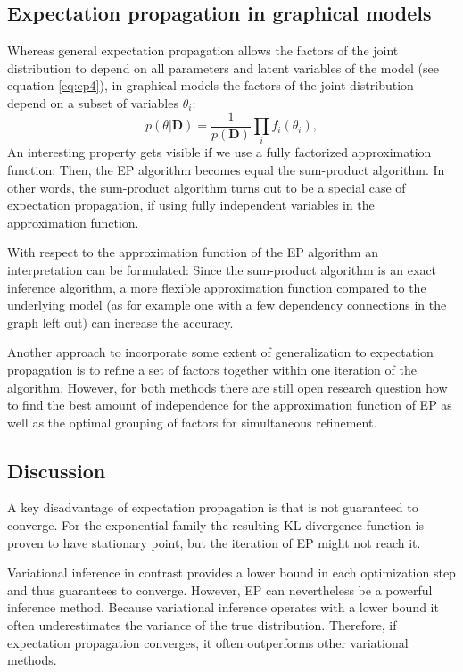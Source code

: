 \documentclass{sigkdd}
\begin{document}
\subsection{Expectation propagation in graphical models}
Whereas general expectation propagation allows the factors of the joint distribution to depend on all parameters and latent variables of the model (see equation \ref{eq:ep4}), in graphical models the factors of the joint distribution depend on a subset of variables $\theta_i$:
\begin{equation}\label{eq:ep9}
p(\theta|\mathbf{D}) = \frac{1}{p(\mathbf{D})} \prod_i f_i(\theta_i),
\end{equation}
An interesting property gets visible if we use a fully factorized approximation function: Then, the EP algorithm becomes equal the sum-product algorithm. In other words, the sum-product algorithm turns out to be a special case of expectation propagation, if using fully independent variables in the approximation function.

With respect to the approximation function of the EP algorithm an interpretation can be formulated: Since the sum-product algorithm is an exact inference algorithm, a more flexible approximation function compared to the underlying model (as for example one with a few dependency connections in the graph left out) can increase the accuracy.

Another approach to incorporate some extent of generalization to expectation propagation is to refine a set of factors together within one iteration of the algorithm. However, for both methods there are still open research question how to find the best amount of independence for the approximation function of EP as well as the optimal grouping of factors for simultaneous refinement.

\subsection{Discussion}
A key disadvantage of expectation propagation is that is not guaranteed to converge. For the exponential family the resulting KL-divergence function is proven to have stationary point, but the iteration of EP might not reach it.

Variational inference in contrast provides a lower bound in each optimization step and thus guarantees to converge. However, EP can nevertheless be a powerful inference method. Because variational inference operates with a lower bound it often underestimates the variance of the true distribution. Therefore, if expectation propagation converges, it often outperforms other variational methods.
\end{document}
